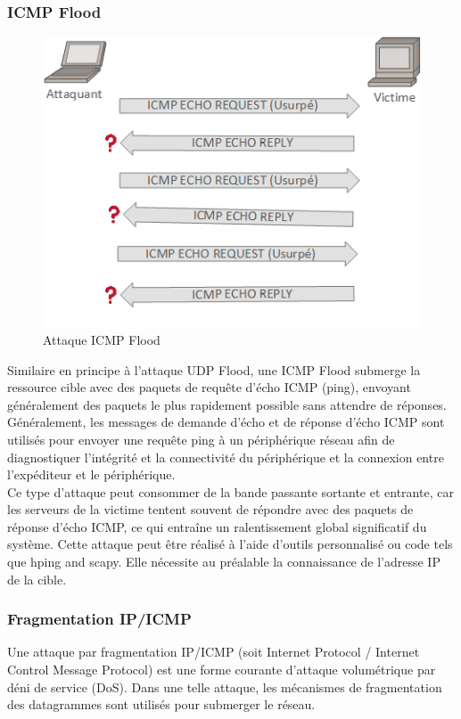 	\subsubsection{ICMP Flood}	
	\begin{figure}[h]
		\begin{center}
			\includegraphics[width=\textwidth]{IMAGES/ORIGINALS/Attaque_ICMP_Flood}
		\end{center}
		\caption{Attaque ICMP Flood}
	\end{figure}
		
	Similaire en principe à l'attaque UDP Flood, une ICMP Flood submerge la ressource cible avec des paquets de requête d'écho ICMP (ping), envoyant généralement des paquets le plus rapidement possible sans attendre de réponses. Généralement, les messages de demande d'écho et de réponse d'écho ICMP sont utilisés pour envoyer une requête ping à un périphérique réseau afin de diagnostiquer l'intégrité et la connectivité du périphérique et la connexion entre l'expéditeur et le périphérique.\\
	
	Ce type d'attaque peut consommer de la bande passante sortante et entrante, car les serveurs de la victime tentent souvent de répondre avec des paquets de réponse d'écho ICMP, ce qui entraîne un ralentissement global significatif du système. Cette attaque peut être réalisé à l’aide d’outils personnalisé ou code tels que hping and scapy. Elle nécessite au préalable la connaissance de l’adresse IP de la cible.

	\subsubsection{Fragmentation IP/ICMP}
	Une attaque par fragmentation IP/ICMP (soit Internet Protocol / Internet Control Message Protocol) est une forme courante d'attaque volumétrique par déni de service (DoS). Dans une telle attaque, les mécanismes de fragmentation des datagrammes sont utilisés pour submerger le réseau.\\

